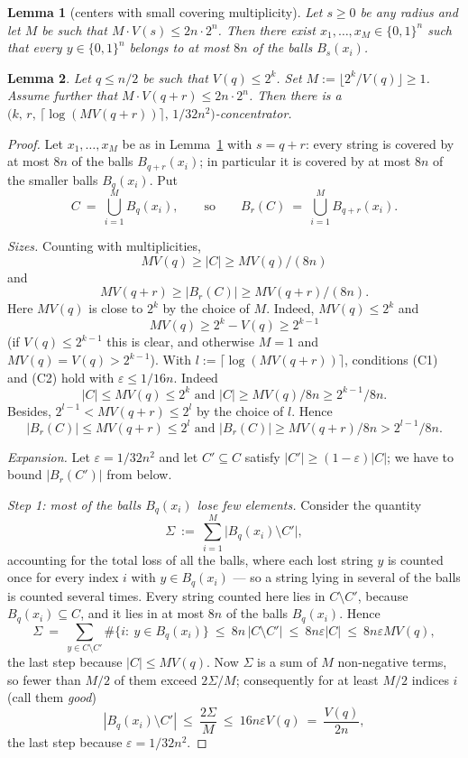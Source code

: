 \documentclass[10pt,a4paper]{amsart}
\newtheorem{lemma}{Lemma}
\newcommand{\eps}{\varepsilon}
\renewcommand{\ge}{\geqslant}
\renewcommand{\le}{\leqslant}
\begin{document}
\begin{lemma}[centers with small covering multiplicity]\label{lem:pack}
Let $s\ge0$ be any radius and let $M$ be such that
$M\cdot V(s)\le 2n\cdot2^n$. Then there exist $x_1,\dots,x_M\in\{0,1\}^n$ such that every $y\in\{0,1\}^n$ belongs to at
most $8n$ of the balls $B_s(x_i)$.
\end{lemma}

\begin{lemma}\label{lem:construct}
Let $q\le n/2$ be such that $V(q)\le2^k$. Set  $M:=\lfloor2^k/V(q)\rfloor\ge1$.
Assume further that 
$M\cdot V(q+r)\le2n\cdot2^n$. Then there is a
$\bigl(k,\,r,\,\lceil\log (M V(q+r))\rceil,\,1/32n^2\bigr)$-concentrator.
\end{lemma}

\begin{proof}
Let $x_1,\dots,x_M$ be as in Lemma~\ref{lem:pack} with $s=q+r$: every string is
covered by at most $8n$ of the balls $B_{q+r}(x_i)$; in particular it is covered
by at most $8n$ of the smaller balls $B_{q}(x_i)$. Put
\[
  C\ =\ \bigcup_{i=1}^{M}B_q(x_i),\qquad\text{so}\qquad
  B_r(C)\ =\ \bigcup_{i=1}^{M}B_{q+r}(x_i).
\]

\emph{Sizes.} Counting with multiplicities, $$MV(q)\ge|C|\ge MV(q)/(8n)$$ and
$$MV(q+r)\ge|B_r(C)|\ge MV(q+r)/(8n).$$ 
Here $MV(q)$ is close to $2^k$  by the choice of $M$. Indeed, $MV(q)\le2^k$ and
$$MV(q)\ge2^k-V(q)\ge2^{k-1}$$ (if $V(q)\le2^{k-1}$ this is clear, and otherwise
$M=1$ and $MV(q)=V(q)>2^{k-1}$). With $l:=\lceil\log(MV(q+r))\rceil$,
conditions (C1) and (C2) hold with $\eps\le1/16n$. Indeed
$$
|C|\le MV(q)\le 2^k \text{ and } 
|C|\ge MV(q)/8n\ge2^{k-1}/8n.
$$ 
Besides,  $2^{l-1}<MV(q+r)\le 2^l$ by the choice of $l$. Hence 
$$
|B_r(C)|\le MV(q+r)\le 2^l \text{ and } |B_r(C)|\ge MV(q+r)/8n>2^{l-1}/8n.
$$

\emph{Expansion.} Let $\eps=1/32n^2$ and let $C'\subseteq C$ satisfy
$|C'|\ge(1-\eps)|C|$; we have to bound $|B_r(C')|$ from below.

\emph{Step 1: most of the balls $B_q(x_i)$ lose few elements.} Consider the quantity
\[
  \Sigma\ :=\ \sum_{i=1}^{M}\bigl|B_q(x_i)\setminus C'\bigr| ,
\]
accounting for the total loss of all the balls, where 
each lost string $y$ is counted once for every index $i$ with $y\in B_q(x_i)$
--- so a string lying in several of the balls is counted several times.
 Every string counted here lies in
$C\setminus C'$, because $B_q(x_i)\subseteq C$, and it lies in at most $8n$ of
the balls $B_q(x_i)$. Hence
\[
  \Sigma\ =\ \sum_{y\in C\setminus C'}\#\{i:\ y\in B_q(x_i)\}\ \le\
  8n\,|C\setminus C'|\ \le\ 8n\eps|C|\ \le\ 8n\eps MV(q),
\]
the last step because $|C|\le MV(q)$. Now $\Sigma$ is a sum of $M$ non-negative
terms, so fewer than $M/2$ of them exceed $2\Sigma/M$; consequently for at
least $M/2$ indices $i$ (call them \emph{good})
\[
  |B_q(x_i)\setminus C'|\ \le\ \frac{2\Sigma}{M}\ \le\ 16n\eps V(q)\ =\
  \frac{V(q)}{2n},
\]
the last step because  $\eps=1/32n^2$.


\end{proof}
\end{document}
